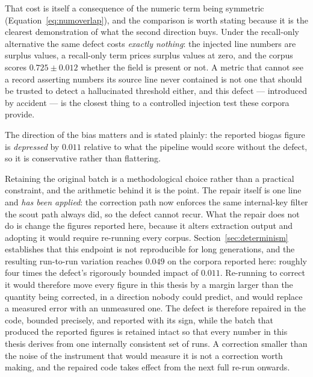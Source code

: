 \documentclass[11pt]{article}
\begin{document}
That cost is itself a consequence of the numeric term being symmetric
(Equation~\ref{eq:numoverlap}), and the comparison is worth stating because it
is the clearest demonstration of what the second direction buys. Under the
recall-only alternative the same defect costs \emph{exactly nothing}: the
injected line numbers are surplus values, a recall-only term prices surplus
values at zero, and the corpus scores $0.725 \pm 0.012$ whether the field is
present or not. A metric that cannot see a record asserting numbers its source
line never contained is not one that should be trusted to detect a hallucinated
threshold either, and this defect --- introduced by accident --- is the closest
thing to a controlled injection test these corpora provide.

The direction of the bias matters and is stated plainly: the reported biogas
figure is \emph{depressed} by $0.011$ relative to what the pipeline would score
without the defect, so it is conservative rather than flattering.

Retaining the original batch is a methodological choice rather than a practical
constraint, and the arithmetic behind it is the point. The repair itself is one
line and \emph{has been applied}: the correction path now enforces the same
internal-key filter the scout path always did, so the defect cannot recur. What
the repair does not do is change the figures reported here, because it alters
extraction output and adopting it would require re-running every corpus. Section~\ref{sec:determinism} establishes that
this endpoint is not reproducible for long generations, and the resulting
run-to-run variation reaches $0.049$ on the corpora reported here: roughly four
times the defect's rigorously bounded impact of $0.011$. Re-running to correct
it would therefore move every figure in this thesis by a margin larger than the
quantity being corrected, in a direction nobody could predict, and would replace
a measured error with an unmeasured one. The defect is therefore repaired in the
code, bounded precisely, and reported with its sign, while the batch that
produced the reported figures is retained intact so that every number in this
thesis derives from one internally consistent set of runs. A correction smaller
than the noise of the instrument that would measure it is not a correction worth
making, and the repaired code takes effect from the next full re-run onwards.
\end{document}

